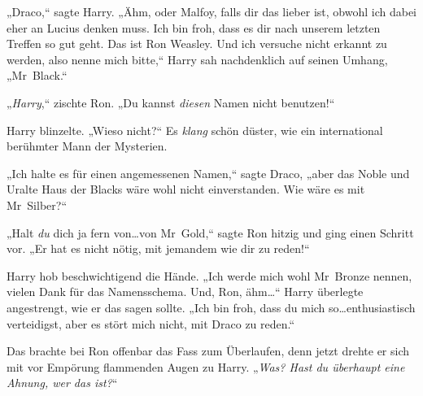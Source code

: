 „Draco,“ sagte Harry. „Ähm, oder Malfoy, falls dir das lieber ist, obwohl ich dabei eher an Lucius denken muss. Ich bin froh, dass es dir nach unserem letzten Treffen so gut geht. Das ist Ron Weasley. Und ich versuche nicht erkannt zu werden, also nenne mich bitte,“ Harry sah nachdenklich auf seinen Umhang, „Mr~Black.“

„\emph{Harry},“ zischte Ron. „Du kannst \emph{diesen} Namen nicht benutzen!“

Harry blinzelte. „Wieso nicht?“ Es \emph{klang} schön düster, wie ein international berühmter Mann der Mysterien.

„Ich halte es für einen angemessenen Namen,“ sagte Draco, „aber das Noble und Uralte Haus der Blacks wäre wohl nicht einverstanden. Wie wäre es mit Mr~Silber?“

„Halt \emph{du} dich ja fern von…von Mr~Gold,“ sagte Ron hitzig und ging einen Schritt vor. „Er hat es nicht nötig, mit jemandem wie dir zu reden!“

Harry hob beschwichtigend die Hände. „Ich werde mich wohl Mr~Bronze nennen, vielen Dank für das Namensschema. Und, Ron, ähm…“ Harry überlegte angestrengt, wie er das sagen sollte. „Ich bin froh, dass du mich so…enthusiastisch verteidigst, aber es stört mich nicht, mit Draco zu reden.“

Das brachte bei Ron offenbar das Fass zum Überlaufen, denn jetzt drehte er sich mit vor Empörung flammenden Augen zu Harry. „\emph{Was? Hast du überhaupt eine \emph{Ahnung}, wer das ist?}“

